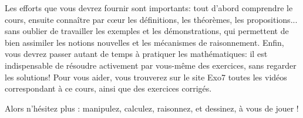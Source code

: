 \medskip


Les efforts que vous devrez fournir sont importants: tout d'abord comprendre le cours, ensuite connaître par c\oe ur les définitions, les théorèmes, les propositions... sans oublier de travailler les exemples et les démonstrations, qui permettent de bien assimiler les notions nouvelles et les mécanismes de raisonnement. Enfin, vous devrez passer autant de temps à pratiquer les mathématiques: il est  indispensable de résoudre activement par vous-même des exercices, sans regarder les solutions! Pour vous aider, vous trouverez sur le site Exo7 toutes les vidéos correspondant à ce cours, ainsi que des exercices corrigés. 


Alors n'hésitez plus : manipulez, calculez, raisonnez, et dessinez, à vous de jouer !


\vspace*{\fill}

\newpage
{}
\tableofcontents

